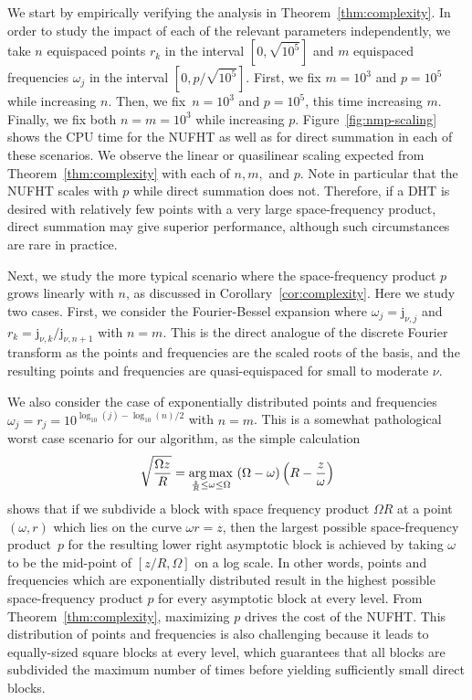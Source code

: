 We start by empirically verifying the analysis in Theorem~\ref{thm:complexity}.
In order to study the impact of each of the relevant parameters independently,
we take $n$ equispaced points $r_k$ in the interval $[0,\sqrt{10^5}]$ and $m$
equispaced frequencies $\omega_j$ in the interval $[0,p/\sqrt{10^5}]$. First, we
fix $m=10^3$ and $p=10^5$ while increasing $n$. Then, we fix~$n=10^3$ and
$p=10^5$, this time increasing $m$. Finally, we fix both $n = m = 10^3$ while
increasing $p$. Figure~\ref{fig:nmp-scaling} shows the CPU time for the NUFHT as
well as for direct summation in each of these scenarios. We observe the linear
or quasilinear scaling expected from Theorem~\ref{thm:complexity} with each of
$n, m,$ and $p$. Note in particular that the NUFHT scales with $p$ while direct
summation does not. Therefore, if a DHT is desired with relatively few points
with a very large space-frequency product, direct summation may give superior
performance, although such circumstances are rare in practice.

Next, we study the more typical scenario where the space-frequency product $p$
grows linearly with $n$, as discussed in Corollary~\ref{cor:complexity}. Here we
study two cases. First, we consider the Fourier-Bessel expansion where $\omega_j
= \mathrm{j}_{\nu, j}$ and $r_k = \mathrm{j}_{\nu, k}/\mathrm{j}_{\nu, n+1}$
with $n = m$. This is the direct analogue of the discrete Fourier transform as
the points and frequencies are the scaled roots of the basis, and the resulting
points and frequencies are quasi-equispaced for small to moderate $\nu$. 

We also consider the case of exponentially distributed points and frequencies
$\omega_j = r_j = 10^{\log_{10}(j) - \log_{10}(n)/2}$ with $n = m$. This is a
somewhat pathological worst case scenario for our algorithm, as the simple
calculation
\begin{equation}
  \sqrt{\frac{\Omega z}{R}} = \operatorname*{arg\,max}_{\frac{z}{R} \leq \omega \leq \Omega} \ (\Omega - \omega)\left(R - \frac{z}{\omega}\right)
\end{equation}
shows that if we subdivide a block with space frequency product $\Omega R$ at a
point $(\omega, r)$ which lies on the curve $\omega r = z$, then the largest
possible space-frequency product~$p$ for the resulting lower right asymptotic
block is achieved by taking $\omega$ to be the mid-point of $[z/R, \Omega]$ on a
log scale. In other words, points and frequencies which are exponentially
distributed result in the highest possible space-frequency product $p$ for every
asymptotic block at every level. From Theorem~\ref{thm:complexity}, maximizing
$p$ drives the cost of the NUFHT. This distribution of points and frequencies is
also challenging because it leads to equally-sized square blocks at every level,
which guarantees that all blocks are subdivided the maximum number of times
before yielding sufficiently small direct blocks.



